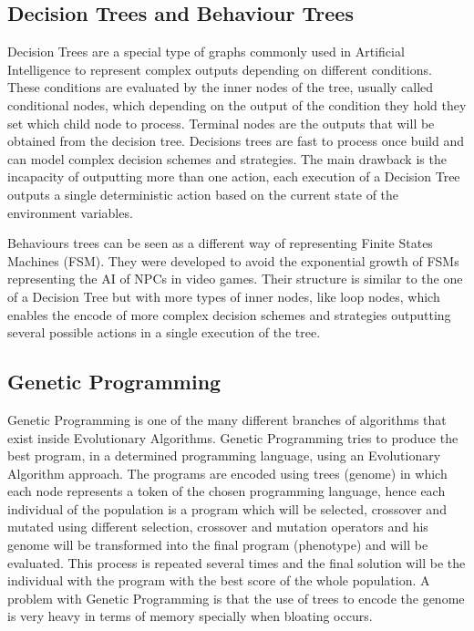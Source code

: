 \documentclass{llncs}
\begin{document}
\subsection{Decision Trees and Behaviour Trees}

Decision Trees are a special type of graphs commonly used in Artificial Intelligence to represent complex outputs depending on different conditions. These conditions are evaluated by the inner nodes of the tree, usually called conditional nodes, which depending on the output of the condition they hold they set which child node to process. Terminal nodes are the outputs that will be obtained from the decision tree. 
Decisions trees are fast to process once build and can model complex decision schemes and strategies. The main drawback is the incapacity of outputting more than one action, each execution of a Decision Tree outputs a single deterministic action based on the current state of the environment variables.

Behaviours trees can be seen as a different way of representing Finite States Machines (FSM). They were developed to avoid the exponential growth of FSMs representing the AI of NPCs in video games. Their structure is similar to the one of a Decision Tree but with more types of inner nodes, like loop nodes, which enables the encode of more complex decision schemes and strategies outputting several possible actions in a single execution of the tree.
\subsection{Genetic Programming}
Genetic Programming is one of the many different branches of algorithms that exist inside Evolutionary Algorithms.
Genetic Programming tries to produce the best program, in a determined programming language, using an Evolutionary Algorithm approach. The programs are encoded using trees (genome)  in which each node represents a token of the chosen programming language, hence each individual of the population is a program which will be selected, crossover and mutated using different selection, crossover and mutation operators and his genome will be transformed into the final program (phenotype) and will be evaluated. This process is repeated several times and the final solution will be the individual with the program with the best score of the whole population. A problem with Genetic Programming is that the use of trees to encode the genome is very heavy in terms of memory specially when bloating occurs.  %
\end{document}
